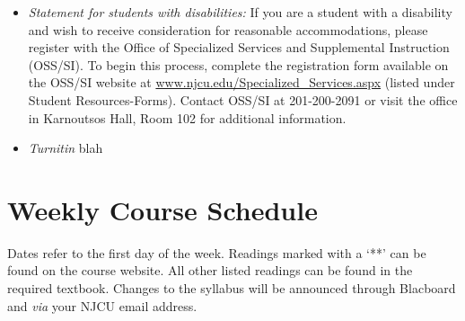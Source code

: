 \documentclass[article,oneside]{memoir}
\begin{document}
\begin{itemize}
\item \textit{Statement for students with disabilities:} If you are a student
with a disability and wish to receive consideration for reasonable
accommodations, please register with the Office of Specialized Services
and Supplemental Instruction (OSS/SI). To begin this process, complete
the registration form available on the OSS/SI website at
\href{http://www.njcu.edu/Specialized_Services.aspx}{www.njcu.edu/Specialized\_Services.aspx}
(listed under Student Resources-Forms). Contact OSS/SI at 201-200-2091
or visit the office in Karnoutsos Hall, Room 102 for additional
information.

\item \textit{Turnitin} blah

\end{itemize}



\section{Weekly Course Schedule}
Dates refer to the first day of the week. Readings marked with a `**' can be found on the course website. All other listed readings can be found in the required textbook. Changes to the syllabus will be announced through Blacboard and \emph{via} your NJCU email address.
\end{document}
